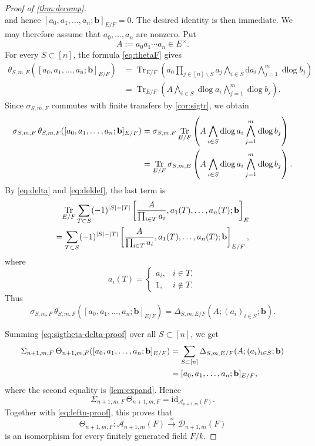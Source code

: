 \documentclass[a4paper,12pt,reqno]{amsart}
\numberwithin{equation}{section}
\theoremstyle{definition}
\DeclareMathOperator{\dlog}{dlog}
\DeclareMathOperator{\Tr}{Tr}
\newcommand{\Id}{\mathrm{id}}
\renewcommand{\d}{\mathrm{d}}
\newcommand{\Acal}{\mathcal{A}}
\newcommand{\Dcal}{\mathcal{D}}
\newcommand{\vb}{\mathbf{b}}
\begin{document}
\begin{proof}[Proof of \autoref{thm:decomp}]
\[\]
and hence $[a_0,a_1,\ldots,a_n;\vb]_{E/F} =0$. 
The desired identity is then immediate.  
We may therefore assume that
$a_0,\ldots,a_n$ are nonzero.  Put
\[
 A:=a_0a_1\cdots a_n\in E^\times.
\]
For every $S\subset[n]$, the formula
\eqref{eq:thetaF} gives
\begin{align} \label{eq:thlog-proof}
 \theta_{S,m,F}([a_0,a_1,\ldots,a_n;\vb]_{E/F})
 &=
 \Tr_{E/F}\left(
 a_0\prod_{j\in[n]\smallsetminus S}a_j
 \bigwedge_{i\in S}\d a_i\bigwedge_{j=1}^m\dlog b_j
 \right)\\
 &=
 \Tr_{E/F}\left(
 A\bigwedge_{i\in S}\dlog a_i\bigwedge_{j=1}^m\dlog b_j
 \right).
\end{align}
Since $\sigma_{S,m,F}$ commutes with finite transfers by
\autoref{cor:sigtr}, we obtain
\begin{align}
 \sigma_{S,m,F}\,\theta_{S,m,F}([a_0,a_1,\ldots,a_n;\vb]_{E/F})
 &=
 \sigma_{S,m,F}
 \Tr_{E/F}\left(
 A\bigwedge_{i\in S}\dlog a_i\bigwedge_{j=1}^m\dlog b_j
 \right)\notag\\
 &=
 \Tr_{E/F}
 \sigma_{S,m,E}\left(
 A\bigwedge_{i\in S}\dlog a_i\bigwedge_{j=1}^m\dlog b_j
 \right).
 \label{eq:sigtheta-proof}
\end{align}
By \eqref{eq:delta} and \eqref{eq:deldef}, the last term is
\begin{align}
 \Tr_{E/F}
 \sum_{T\subset S}(-1)^{|S|-|T|}
 \left[
 \frac{A}{\prod_{i\in T}a_i},
 a_1(T),\ldots,a_n(T);\vb
 \right]_E
 \notag\\
 =
 \sum_{T\subset S}(-1)^{|S|-|T|}
 \left[
 \frac{A}{\prod_{i\in T}a_i},
 a_1(T),\ldots,a_n(T);\vb
 \right]_{E/F},
 \label{eq:delta-transfer-proof}
\end{align}
where
\[
 a_i(T)=
 \begin{cases}
 a_i,&i\in T,\\
 1,&i\notin T.
 \end{cases}
\]
Thus
\begin{equation}\label{eq:sigtheta-delta-proof}
 \sigma_{S,m,F}\,\theta_{S,m,F}([a_0,a_1,\ldots,a_n;\vb]_{E/F})
 =
 \Delta_{S,m,E/F}(A;(a_i)_{i\in S};\vb).
\end{equation}

Summing \eqref{eq:sigtheta-delta-proof} over all
$S\subset[n]$, we get
\begin{align}
 \Sigma_{n+1,m,F}\,\Theta_{n+1,m,F}([a_0,a_1,\ldots,a_n;\vb]_{E/F})
 &=
 \sum_{S\subset[n]}
 \Delta_{S,m,E/F}(A;(a_i)_{i\in S};\vb)\notag\\
 &=
 [a_0,a_1,\ldots,a_n;\vb]_{E/F},
 \label{eq:rightn-proof}
\end{align}
where the second equality is \autoref{lem:expand}.  Hence
\[
 \Sigma_{n+1,m,F}\,\Theta_{n+1,m,F}
 =
 \Id_{\Acal_{n+1,m}(F)}.
\]
Together with \eqref{eq:leftn-proof}, this proves that
\[
 \Theta_{n+1,m,F}:
 \Acal_{n+1,m}(F)
 \xrightarrow{\simeq}
 \Dcal_{n+1,m}(F)
\]
is an isomorphism for every finitely generated field $F/k$.


\end{proof}
\end{document}
